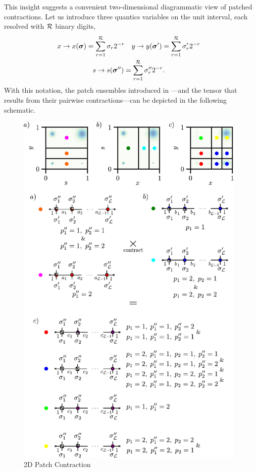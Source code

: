 This insight suggests a convenient two-dimensional diagrammatic view of patched contractions. Let us introduce three quantics variables on the unit interval, each resolved with $\mathcal{R}$ binary digits,
\begin{equation}
    \begin{gathered}
        x \to x(\boldsymbol{\sigma}) = \sum_{r=1}^{\mathcal{R}} \sigma_r 2^{-r} \quad y \to y(\boldsymbol{\sigma}') = \sum_{r=1}^{\mathcal{R}} \sigma'_r 2^{-r}\\ 
        s \to s(\boldsymbol{\sigma}'') = \sum_{r=1}^{\mathcal{R}} \sigma''_r 2^{-r}.
    \end{gathered}
\end{equation}
With this notation, the patch ensembles introduced in —and the tensor that results from their pairwise contractions—can be depicted in the following schematic.

\begin{figure}[ht!]
    \centering
    \includegraphics{figures/2DPatchContrRepr.pdf}
    \caption{2D Patch Contraction}
\end{figure}

